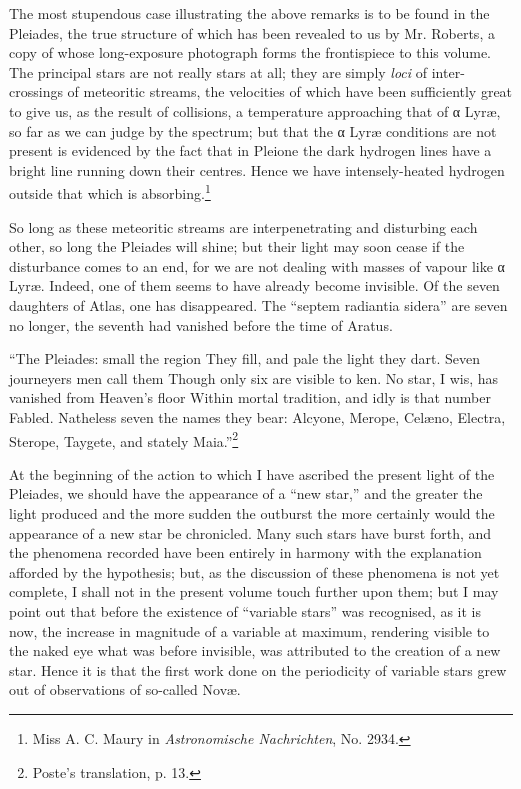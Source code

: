 \documentclass[a4paper, 12pt, oneside, polutonikogreek, english]{article}
\begin{document}
The most stupendous case illustrating the above remarks is to be found in the Pleiades, the true structure of which has been revealed to us by Mr. Roberts, a copy of whose long-exposure photograph forms the frontispiece to this volume. The principal stars are not really stars at all; they are simply \emph{loci} of inter-crossings of meteoritic streams, the velocities of which have been sufficiently great to give us, as the result of collisions, a temperature approaching that of α Lyræ, so far as we can judge by the spectrum; but that the α Lyræ conditions are not present is evidenced by the fact that in Pleione the dark hydrogen lines have a bright line running down their centres. Hence we have intensely-heated hydrogen outside that which is absorbing.\footnote{Miss A. C. Maury in \emph{Astronomische Nachrichten}, No. 2934.}

So long as these meteoritic streams are interpenetrating and disturbing each other, so long the Pleiades will shine; but their light may soon cease if the disturbance comes to an end, for we are not dealing with masses of vapour like α Lyræ. Indeed, one of them seems to have already become invisible. Of the seven daughters of Atlas, one has disappeared. The ``septem radiantia sidera'' are seven no longer, the seventh had vanished before the time of Aratus.

``The Pleiades: small the region 
They fill, and pale the light they dart. 
Seven journeyers men call them 
Though only six are visible to ken. 
No star, I wis, has vanished from Heaven's floor 
Within mortal tradition, and idly is that number 
Fabled. Natheless seven the names they bear: 
Alcyone, Merope, Celæno, Electra, 
Sterope, Taygete, and stately Maia.''\footnote{Poste's translation, p. 13.}

At the beginning of the action to which I have ascribed the present light of the Pleiades, we should have the appearance of a ``new star,'' and the greater the light produced and the more sudden the outburst the more certainly would the appearance of a new star be chronicled. Many such stars have burst forth, and the phenomena recorded have been entirely in harmony with the explanation afforded by the hypothesis; but, as the discussion of these phenomena is not yet complete, I shall not in the present volume touch further upon them; but I may point out that before the existence of ``variable stars'' was recognised, as it is now, the increase in magnitude of a variable at maximum, rendering visible to the naked eye what was before invisible, was attributed to the creation of a new star. Hence it is that the first work done on the periodicity of variable stars grew out of observations of so-called Novæ.
\end{document}

